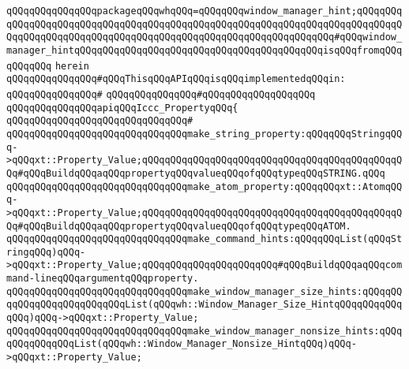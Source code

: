 \verb|qQQqqQQqqQQqqQQqpackageqQQqwhqQQq=qQQqqQQqwindow_manager_hint;qQQqqQQqqQQqqQQqqQQqqQQqqQQqqQQqqQQqqQQqqQQqqQQqqQQqqQQqqQQqqQQqqQQqqQQqqQQqqQQqqQQqqQQqqQQqqQQqqQQqqQQqqQQqqQQqqQQqqQQqqQQqqQQqqQQqqQQq#qQQqwindow_manager_hintqQQqqQQqqQQqqQQqqQQqqQQqqQQqqQQqqQQqqQQqqQQqisqQQqfromqQQqqQQqqQQq|\newline
\verb|herein|\newline
\newline
\verb|qQQqqQQqqQQqqQQq#qQQqThisqQQqAPIqQQqisqQQqimplementedqQQqin:|\newline
\verb|qQQqqQQqqQQqqQQq#|\newline
\verb|qQQqqQQqqQQqqQQq#qQQqqQQqqQQqqQQqqQQq|\newline
\newline
\verb|qQQqqQQqqQQqqQQqapiqQQqIccc_PropertyqQQq{|\newline
\verb|qQQqqQQqqQQqqQQqqQQqqQQqqQQqqQQq#|\newline
\verb|qQQqqQQqqQQqqQQqqQQqqQQqqQQqqQQqmake_string_property:qQQqqQQqStringqQQq->qQQqxt::Property_Value;qQQqqQQqqQQqqQQqqQQqqQQqqQQqqQQqqQQqqQQqqQQqqQQq#qQQqBuildqQQqaqQQqpropertyqQQqvalueqQQqofqQQqtypeqQQqSTRING.qQQq|\newline
\newline
\verb|qQQqqQQqqQQqqQQqqQQqqQQqqQQqqQQqmake_atom_property:qQQqqQQqxt::AtomqQQq->qQQqxt::Property_Value;qQQqqQQqqQQqqQQqqQQqqQQqqQQqqQQqqQQqqQQqqQQqqQQq#qQQqBuildqQQqaqQQqpropertyqQQqvalueqQQqofqQQqtypeqQQqATOM.|\newline
\newline
\verb|qQQqqQQqqQQqqQQqqQQqqQQqqQQqqQQqmake_command_hints:qQQqqQQqList(qQQqStringqQQq)qQQq->qQQqxt::Property_Value;qQQqqQQqqQQqqQQqqQQqqQQq#qQQqBuildqQQqaqQQqcommand-lineqQQqargumentqQQqproperty.|\newline
\newline
\verb|qQQqqQQqqQQqqQQqqQQqqQQqqQQqqQQqmake_window_manager_size_hints:qQQqqQQqqQQqqQQqqQQqqQQqqQQqList(qQQqwh::Window_Manager_Size_HintqQQqqQQqqQQqqQQq)qQQq->qQQqxt::Property_Value;|\newline
\verb|qQQqqQQqqQQqqQQqqQQqqQQqqQQqqQQqmake_window_manager_nonsize_hints:qQQqqQQqqQQqqQQqList(qQQqwh::Window_Manager_Nonsize_HintqQQq)qQQq->qQQqxt::Property_Value;|\newline
\newline
